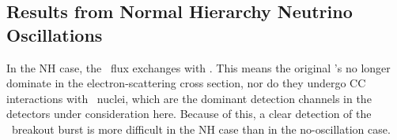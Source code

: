 \subsection{Results from Normal Hierarchy Neutrino Oscillations}
In the NH case, the \nue\ flux exchanges with \nuxpart.  This
means the original \nue's no longer dominate in the
electron-scattering cross section, nor do they undergo CC
interactions with \ nuclei, which are the dominant detection
channels in the detectors under consideration here.  Because of this,
a clear detection of the \nue\ breakout burst is more difficult
in the NH case than in the no-oscillation case.


